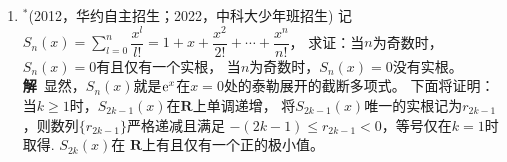 \begin{enumerate}[label={【\textbf{例\thechapter.\arabic*}】},
 leftmargin=\inteval{\myenumleftmargin}pt,
 itemsep=\inteval{\myenumitempsep}pt,
 itemindent=\inteval{\myenumitemindent}pt]
\textbf{方法二}\ 不妨设$ x\leq a\leq b $，那么$ 0<x\leq 2 $. \\
I.当$ x+a\geq 7 $时，$ b\geq a\geq 5 $，那么
\begin{gather*}
    \dfrac{1}{\sqrt{1+x}}<1,\ \dfrac{1}{\sqrt{1+a}}+\dfrac{1}{\sqrt{1+b}}\leq
    \dfrac{2}{\sqrt{1+5}}<1
\end{gather*}
所以，$ f(x)=\dfrac{1}{\sqrt{1+x}}+\dfrac{1}{\sqrt{1+a}}+\dfrac{1}{\sqrt{1+b}}<2 $. \\
II.当$ x+a<7 $时，
\begin{gather*}
    \dfrac{1}{1+x}=1-\dfrac{x}{1+x}<1-\dfrac{x}{1+x}+\dfrac{x^2}{4(1+x)^2}=\left[
    1-\dfrac{x}{2(1+x)}\right]^2 \\
    \dfrac{1}{\sqrt{1+x}}<1-\dfrac{x}{2(1+x)}
\end{gather*}
同理可得：$ \dfrac{1}{\sqrt{1+a}}<1-\dfrac{a}{2(1+a)} $.于是，
\begin{align*}
    f(x)<2-\dfrac{1}{2}\left(\dfrac{x}{1+x}+\dfrac{a}{1+a}-
    2\sqrt{\dfrac{ax}{ax+8}}\right)
\end{align*}
又因为
\begin{align*}
    \dfrac{x}{1+x}+\dfrac{a}{1+a}\geq 2\sqrt{\dfrac{ax}{(1+x)(1+a)}}
    =2\sqrt{\dfrac{ax}{1+a+x+ax}}>2\sqrt{\dfrac{ax}{ax+8}}
\end{align*}
所以，$ f(x)<2 $成立。

事实上，结论可加强为$ 1<f(x)\leq \sqrt{3} $.当$ x=a=\dfrac{8}{ax}=2 $时，
$ f(x)=\sqrt{3} $. 证明过程参见脚注中的文献\footnote{王品行.2008年高考数学江西理科卷压轴题之别解[J].中学数学研究,2008:24-25.\\ 蒋明斌.一道西部数学奥林匹克赛题的溯源与推广[J].中学数学研究,2006:50-52.\\
    吴善和.关于IMO42一个不等式的逆向[J].中学数学研究,2004:50-50}。
从高等数学角度来讲，实际上是研究二元函数$ F(x,a)=\dfrac{1}{\sqrt{1+x}}+
\dfrac{1}{\sqrt{1+a}}+\sqrt{\dfrac{ax}{ax+8}} $在$ x>0,a>0 $时的极值，
或者是三元函数$ G(x,a,b)=\dfrac{1}{\sqrt{1+x}}+\dfrac{1}{\sqrt{1+a}}+
\dfrac{1}{\sqrt{1+b}} $在约束条件$ xab=8 $下的极值，
可采用拉格朗日未定乘数法，然后求二重极限。


\item $ ^* $(2012，华约自主招生；2022，中科大少年班招生) 记$ S_n(x)=\sum\limits_{l=0}^{n}
\dfrac{x^l}{l!}=1+x+\dfrac{x^2}{2!}+\cdots+\dfrac{x^n}{n!} $，
求证：当$ n $为奇数时，$ S_n(x)=0 $有且仅有一个实根，
当$ n $为奇数时，$ S_n(x)=0 $没有实根。\\
\textbf{解}\ 显然，$ S_n(x) $就是$ \mathrm{e}^x $在$ x=0 $处的泰勒展开的截断多项式。
下面将证明：当$ k\geq 1 $时，$ S_{2k-1}(x) $在$ \textbf{R} $上单调递增，
将$S_{2k-1}(x)$唯一的实根记为$ r_{2k-1}$，则数列$ \{r_{2k-1}\} $严格递减且满足
$ -(2k-1)\leq r_{2k-1} <0 $，等号仅在$ k=1 $时取得. $ S_{2k}(x) $在
$ \textbf{R} $上有且仅有一个正的极小值。


\end{enumerate}
